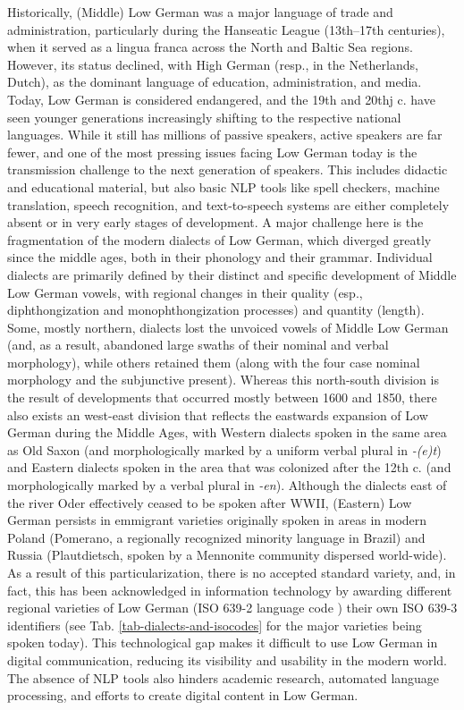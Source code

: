 \documentclass{article}
\newcommand{\word}[1]{\textsl{#1}}
\begin{document}
Historically, (Middle) Low German was a major language of trade and administration, particularly during the Hanseatic League (13th–17th centuries), when it served as a lingua franca across the North and Baltic Sea regions. However, its status declined, with High German (resp., in the Netherlands, Dutch), as the dominant language of education, administration, and media. Today, Low German is considered endangered, and the 19th and 20thj c. have seen younger generations increasingly shifting to the respective national languages. While it still has millions of passive speakers, active speakers are far fewer, and one of the most pressing issues facing Low German today is the transmission challenge to the next generation of speakers. This includes didactic and educational material, but also basic NLP tools like spell checkers, machine translation, speech recognition, and text-to-speech systems are either completely absent or in very early stages of development. A major challenge here is the fragmentation of the modern dialects of Low German, which diverged greatly since the middle ages, both in their phonology and their grammar. Individual dialects are primarily defined by their distinct and specific development of Middle Low German vowels, with regional changes in their quality (esp., diphthongization and monophthongization processes) and quantity (length). Some, mostly northern, dialects lost the unvoiced vowels of Middle Low German (and, as a result, abandoned large swaths of their nominal and verbal morphology), while others retained them (along with the four case nominal morphology and the subjunctive present). Whereas this north-south division is the result of developments that occurred mostly between 1600 and 1850, there also exists an west-east division that reflects the eastwards expansion of Low German during the Middle Ages, with Western dialects spoken in the same area as Old Saxon (and morphologically marked by a uniform verbal plural in \word{-(e)t}) and Eastern dialects spoken in the area that was colonized after the 12th c. (and morphologically marked by a verbal plural in \word{-en}). Although the dialects east of the river Oder effectively ceased to be spoken after WWII, (Eastern) Low German persists in emmigrant varieties originally spoken in areas in modern Poland (Pomerano, a regionally recognized minority language in Brazil) and Russia (Plautdietsch, spoken by a Mennonite community dispersed world-wide). 
As a result of this particularization, there is no accepted standard variety, and, in fact, this has been acknowledged in information technology by awarding different regional varieties of Low German (ISO 639-2 language code ) their own ISO 639-3 identifiers (see Tab. \ref{tab-dialects-and-isocodes} for the major varieties being spoken today). This technological gap makes it difficult to use Low German in digital communication, reducing its visibility and usability in the modern world. The absence of NLP tools also hinders academic research, automated language processing, and efforts to create digital content in Low German. 
\end{document}
